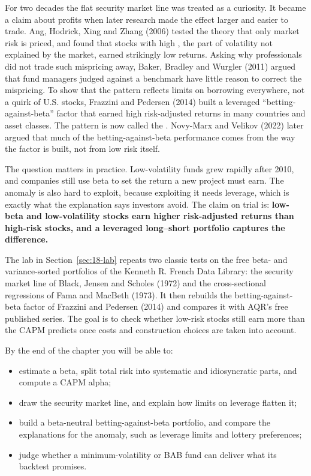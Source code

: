 For two decades the flat security market line was treated as a curiosity. It became a claim about profits when later research made the effect larger and easier to trade. Ang, Hodrick, Xing and Zhang (2006) tested the theory that only market risk is priced, and found that stocks with high , the part of volatility not explained by the market, earned strikingly low returns. Asking why professionals did not trade such mispricing away, Baker, Bradley and Wurgler (2011) argued that fund managers judged against a benchmark have little reason to correct the mispricing. To show that the pattern reflects limits on borrowing everywhere, not a quirk of U.S. stocks, Frazzini and Pedersen (2014) built a leveraged ``betting-against-beta'' factor that earned high risk-adjusted returns in many countries and asset classes. The pattern is now called the . Novy-Marx and Velikov (2022) later argued that much of the betting-against-beta performance comes from the way the factor is built, not from low risk itself.

The question matters in practice. Low-volatility funds grew rapidly after 2010, and companies still use beta to set the return a new project must earn. The anomaly is also hard to exploit, because exploiting it needs leverage, which is exactly what the explanation says investors avoid. The claim on trial is: \textbf{low-beta and low-volatility stocks earn higher risk-adjusted returns than high-risk stocks, and a leveraged long--short portfolio captures the difference.}

The lab in Section~\ref{sec:18-lab} repeats two classic tests on the free beta- and variance-sorted portfolios of the Kenneth R. French Data Library: the security market line of Black, Jensen and Scholes (1972) and the cross-sectional regressions of Fama and MacBeth (1973). It then rebuilds the betting-against-beta factor of Frazzini and Pedersen (2014) and compares it with AQR's free published series. The goal is to check whether low-risk stocks still earn more than the CAPM predicts once costs and construction choices are taken into account.

By the end of the chapter you will be able to:

\begin{itemize}
  \item estimate a beta, split total risk into systematic and idiosyncratic parts, and compute a CAPM alpha;
  \item draw the security market line, and explain how limits on leverage flatten it;
  \item build a beta-neutral betting-against-beta portfolio, and compare the explanations for the anomaly, such as leverage limits and lottery preferences;
  \item judge whether a minimum-volatility or BAB fund can deliver what its backtest promises.
\end{itemize}



